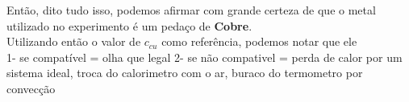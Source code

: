 Então, dito tudo isso, podemos afirmar com grande certeza de que o metal utilizado no experimento é um pedaço de \textbf{Cobre}.\\

Utilizando então o valor de $c_{cu}$ como referência, podemos notar que ele\\
1- se compatível = olha que legal
2- se não compativel = perda de calor por um sistema ideal, troca do calorimetro com o ar, buraco do termometro por convecção
